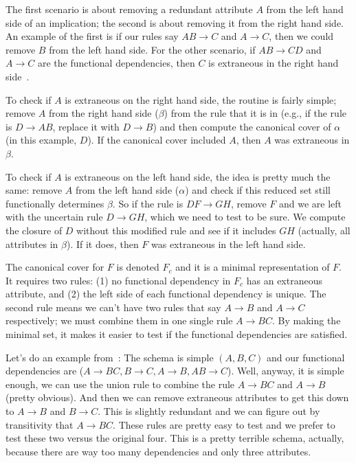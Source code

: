 \documentclass[a4paper]{report}
\begin{document}
The first scenario is about removing a redundant attribute $A$ from the left hand side of an implication; the second is about removing it from the right hand side. An example of the first is if our rules say $AB \rightarrow C$ and $A \rightarrow C$, then we could remove $B$ from the left hand side. For the other scenario, if $AB \rightarrow CD$ and $A \rightarrow C$ are the functional dependencies, then $C$ is extraneous in the right hand side~\cite{dsc}.

To check if $A$ is extraneous on the right hand side, the routine is fairly simple; remove $A$ from the right hand side ($\beta$) from the rule that it is in (e.g., if the rule is $D \rightarrow AB$, replace it with $D \rightarrow B$) and then compute the canonical cover of $\alpha$ (in this example, $D$). If the canonical cover included $A$, then $A$ was extraneous in $\beta$.

To check if $A$ is extraneous on the left hand side, the idea is pretty much the same: remove $A$ from the left hand side ($\alpha$) and check if this reduced set still functionally determines $\beta$. So if the rule is $DF \rightarrow GH$, remove $F$ and we are left with the uncertain rule $D \rightarrow GH$, which we need to test to be sure. We compute the closure of $D$ without this modified rule and see if it includes $GH$ (actually, all attributes in $\beta$). If it does, then $F$ was extraneous in the left hand side.

The canonical cover for $F$ is denoted $F_{c}$ and it is a minimal representation of $F$. It requires two rules: (1) no functional dependency in $F_{c}$ has an extraneous attribute, and (2) the left side of each functional dependency is unique. The second rule means we can't have two rules that say $A \rightarrow B$ and $A \rightarrow C$ respectively; we must combine them in one single rule $A \rightarrow BC$. By making the minimal set, it makes it easier to test if the functional dependencies are satisfied.

Let's do an example from~\cite{dsc}: The schema is simple $(A, B, C)$ and our functional dependencies are ($A \rightarrow BC, B \rightarrow C, A \rightarrow B, AB \rightarrow C$). Well, anyway, it is simple enough, we can use the union rule to combine the rule $A \rightarrow BC$ and $A \rightarrow B$ (pretty obvious). And then we can remove extraneous attributes to get this down to $A \rightarrow B$ and $B \rightarrow C$. This is slightly redundant and we can figure out by transitivity that $A \rightarrow BC$. These rules are pretty easy to test and we prefer to test these two versus the original four. This is a pretty terrible schema, actually, because there are way too many dependencies and only three attributes. 
\end{document}
